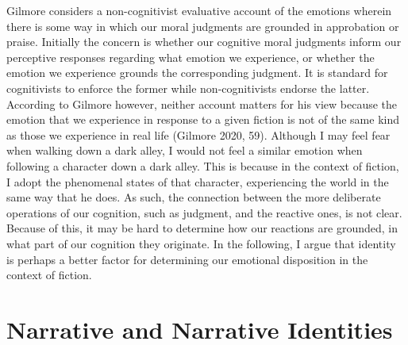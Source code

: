 \documentclass[12pt]{book}
\theoremstyle{definition}
\theoremstyle{remark}
\begin{document}
Gilmore considers a non-cognitivist evaluative account of the emotions wherein there is some way in which our moral judgments are grounded in approbation or praise. Initially the concern is whether our cognitive moral judgments inform our perceptive responses regarding what emotion we experience, or whether the emotion we experience grounds the corresponding judgment. It is standard for cognitivists to enforce the former while non-cognitivists endorse the latter. According to Gilmore however, neither account matters for his view because the emotion that we experience in response to a given fiction is not of the same kind as those we experience in real life (Gilmore 2020, 59). Although I may feel fear when walking down a dark alley, I would not feel a similar emotion when following a character down a dark alley. This is because in the context of fiction, I adopt the phenomenal states of that character, experiencing the world in the same way that he does. As such, the connection between the more deliberate operations of our cognition, such as judgment, and the reactive ones, is not clear. Because of this, it may be hard to determine how our reactions are grounded, in what part of our cognition they originate. In the following, I argue that identity is perhaps a better factor for determining our emotional disposition in the context of fiction.

\section{Narrative and Narrative Identities}\label{narrative-and-narrative-identities}
\end{document}
